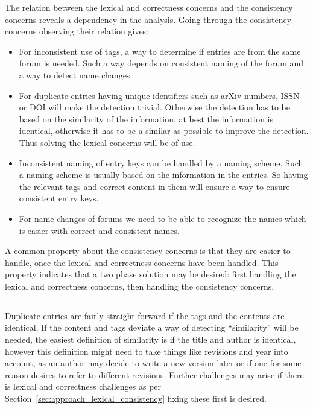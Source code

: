 The relation between the lexical and correctness concerns and the
consistency concerns reveals a dependency in the analysis.  Going
through the consistency concerns observing their relation gives:

\begin{itemize}
\item For inconsistent use of tags, a way to determine if entries are
  from the same forum is needed.  Such a way depends on consistent
  naming of the forum and a way to detect name changes.

\item For duplicate entries having unique identifiers such as arXiv
  numbers, ISSN or DOI will make the detection trivial.  Otherwise the
  detection has to be based on the similarity of the information, at
  best the information is identical, otherwise it has to be a similar
  as possible to improve the detection.  Thus solving the lexical
  concerns will be of use.

\item Inconsistent naming of entry keys can be handled by a naming
  scheme.  Such a naming scheme is usually based on the information in
  the entries.  So having the relevant tags and correct content in
  them will ensure a way to ensure consistent entry keys.

\item For name changes of forums we need to be able to recognize the
  names which is easier with correct and consistent names.
\end{itemize}

A common property about the consistency concerns is that they are
easier to handle, once the lexical and correctness concerns have been
handled.  This property indicates that a two phase solution may be
desired: first handling the lexical and correctness concerns, then
handling the consistency concerns.


\subsection{}
\label{sec:approach_duplicates}

Duplicate entries are fairly straight forward if the tags and the
contents are identical.  If the content and tags deviate a way of
detecting ``similarity'' will be needed, the easiest definition of
similarity is if the title and author is identical, however this
definition might need to take things like revisions and year into
account, as an author may decide to write a new version later or if
one for some reason desires to refer to different revisions.  Further
challenges may arise if there is lexical and correctness challenges as
per Section~\ref{sec:approach_lexical_consistency} fixing these first
is desired.


